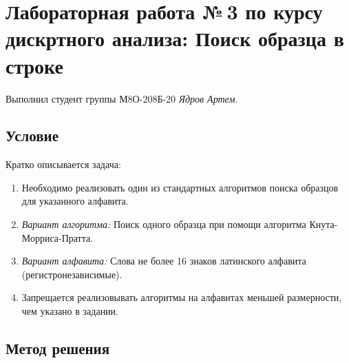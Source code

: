 \documentclass[12pt]{article}
\begin{document}
	
	\section*{Лабораторная работа №\,3 по курсу дискртного анализа: Поиск образца в строке}
	
	Выполнил студент группы М8О-208Б-20 \textit{Ядров Артем}.
	
	\subsection*{Условие}
	
	Кратко описывается задача: 
	\begin{enumerate}
		\item Необходимо реализовать один из стандартных алгоритмов поиска образцов для указанного алфавита.
		\item \textit{Вариант алгоритма:} Поиск одного образца при помощи алгоритма Кнута-Морриса-Пратта.
		\item \textit{Вариант алфавита:} Слова не более 16 знаков латинского алфавита (регистронезависимые).
		\item Запрещается реализовывать алгоритмы на алфавитах меньшей размерности, чем указано в задании. 
	\end{enumerate}
	
	\subsection*{Метод решения}
	
\end{document}
